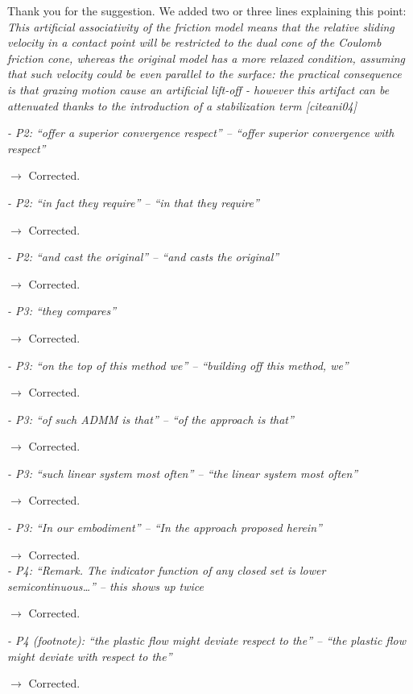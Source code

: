 \documentclass[final,12pt]{article}
\def\reviewercomment#1{{\vskip4mm \color{mycommentcolor} \textit{#1} \vskip2mm}}
\begin{document}
Thank you for the suggestion. We added two or three lines explaining this point:  
\textit{This artificial associativity of the friction model means that the relative sliding velocity in a contact point will be restricted to the dual cone of the Coulomb friction cone, whereas the original model has a more relaxed condition, assuming that such velocity could be even parallel to the surface: the practical consequence is that grazing motion cause an artificial lift-off - however this artifact can be attenuated thanks to the introduction of a stabilization term [cite{ani04}]}

\reviewercomment{
- P2: “offer a superior convergence respect” – “offer superior convergence with respect”
}

$\rightarrow$ Corrected.

\reviewercomment{
- P2: “in fact they require” – “in that they require”
}

$\rightarrow$ Corrected.

\reviewercomment{
- P2: “and cast the original” – “and casts the original”
}

$\rightarrow$ Corrected.

\reviewercomment{
- P3: “they compares”
}

$\rightarrow$ Corrected.

\reviewercomment{
- P3: “on the top of this method we” – “building off this method, we”
}

$\rightarrow$ Corrected.

\reviewercomment{
- P3: “of such ADMM is that” – “of the approach is that”
}

$\rightarrow$ Corrected.

\reviewercomment{
- P3: “such linear system most often” – “the linear system most often”
}

$\rightarrow$ Corrected.

\reviewercomment{
- P3: “In our embodiment” – “In the approach proposed herein”
}

$\rightarrow$ Corrected.\\

\reviewercomment{
- P4: “Remark. The indicator function of any closed set is lower semicontinuous…” – this shows up twice
}

$\rightarrow$ Corrected.

\reviewercomment{
- P4 (footnote): “the plastic flow might deviate respect to the” – “the plastic flow might deviate with respect to the”
}

$\rightarrow$ Corrected.
\end{document}
